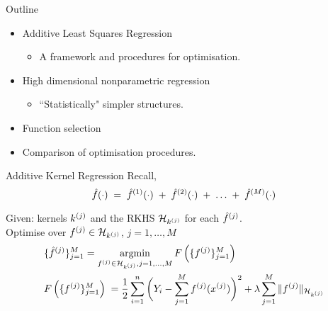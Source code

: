 \begin{frame}{Outline}

  \begin{itemize}
    \item Additive Least Squares Regression
      \begin{itemize}
        \item A framework and procedures for optimisation.
      \end{itemize}
    \vspace{0.1in}
    \item High dimensional nonparametric regression
      \begin{itemize}
        \item ``Statistically" simpler structures.
      \end{itemize}
    \vspace{0.1in}
    \item Function selection
    \vspace{0.1in}
    \item Comparison of optimisation procedures.
  \end{itemize}

\end{frame}


\begin{frame}{Additive Kernel Regression}
Recall,
  \[
    \hat{f}(\cdot) \;=\; \hat{f}^{(1)}(\cdot)\; +\;  
      \hat{f}^{(2)}(\cdot)\;+\;\dots \;+\; \hat{f}^{(M)}(\cdot)
  \]
\pause
\vspace{0.1in}

Given: kernels $k^{(j)}$ and the RKHS ${{\mathcal{H}_{k^{(j)}}}}$ for each $\hat{f}^{(j)}$. \\
Optimise over $f^{(j)} \in {{\mathcal{H}_{k^{(j)}}}}$, $j = 1,\dots,M$
\vspace{0.1in}
\pause
  \begin{align*}
  & \{\hat{f}^{(j)}\}_{j=1}^M =
  \mathop{\mathrm{argmin}}_{f^{(j)} \in {{\mathcal{H}_{k^{(j)}}}}, j = 1,\dots, M} 
    F\left( \{f^{(j)}\}_{j=1}^M \right) \\
  & F\left( \{f^{(j)}\}_{j=1}^M \right)  \;=  
    \frac{1}{2}\sum_{i=1}^n \bigg(Y_i - \sum_{j=1}^M f^{(j)} (x^{(j)}) \bigg)^2 
   + \lambda \sum_{j=1}^M \|f^{(j)}\|_{{\mathcal{H}_{k^{(j)}}}} 
  \end{align*}

\end{frame}



